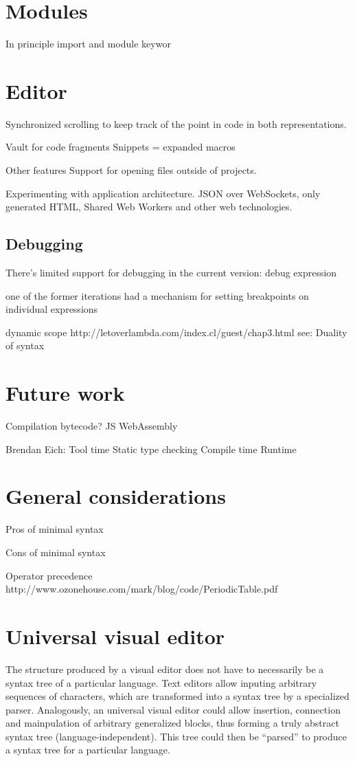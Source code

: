 \section{Modules}
In principle
import and module keywor


\section{Editor}
Synchronized scrolling to keep track of the point in code in both representations.

Vault for code fragments
Snippets = expanded macros

Other features
Support for opening files outside of projects.

Experimenting with application architecture. JSON over WebSockets, only generated HTML, Shared Web Workers and other web technologies.


\subsection{Debugging}

There's limited support for debugging in the current version:
debug expression

one of the former iterations had a mechanism for setting breakpoints on individual expressions


dynamic scope
http://letoverlambda.com/index.cl/guest/chap3.html
see: Duality of syntax

\section{Future work}
Compilation
    bytecode?
    JS
    WebAssembly

Brendan Eich:
Tool time
    Static type checking
Compile time
Runtime

\section{General considerations}

Pros of minimal syntax

Cons of minimal syntax

Operator precedence
http://www.ozonehouse.com/mark/blog/code/PeriodicTable.pdf

\section{Universal visual editor}


The structure produced by a visual editor does not have to necessarily be a syntax tree of a particular language.
Text editors allow inputing arbitrary sequences of characters, which are transformed into a syntax tree by a specialized parser. Analogously, an universal visual editor could allow insertion, connection and mainpulation of arbitrary generalized blocks, thus forming a truly abstract syntax tree (language-independent). This tree could then be ``parsed'' to produce a syntax tree for a particular language.